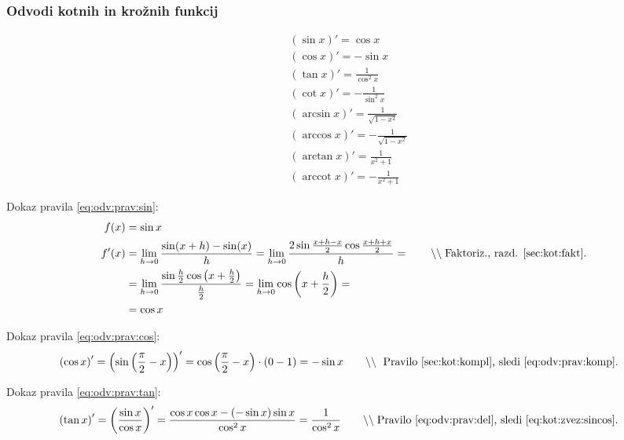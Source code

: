 \documentclass[a4paper,oneside,12pt,fleqn]{article}
\newcommand\krat\cdot
\newcommand{\comment}[1]{\ensuremath{\qquad\backslash\backslash\;}\textnormal{#1}}
\newcommand{\arccot}{\ensuremath{\operatorname{arccot}}} %
\def\kos{\cos}
\def\limh{\lim_{h\rightarrow0}} %
\numberwithin{equation}{section}
\begin{document}
\subsubsection{Odvodi kotnih in krožnih funkcij}
\label{sec:odvod:prav:kot}

\begin{align}
  & \left( \sin x \right)' = \kos x \label{eq:odv:prav:sin} \\
  & \left( \kos x \right)' = -\sin x \label{eq:odv:prav:cos} \\
  & \left( \tan x \right)' = \frac{1}{\kos^2x} \label{eq:odv:prav:tan} \\
  & \left( \cot x \right)' = -\frac{1}{\sin^2x} \label{eq:odv:prav:cot} \\
  & \left( \arcsin x \right)' = \frac{1}{\sqrt{1-x^2}} \label{eq:odv:prav:asin} \\ 
  & \left( \arccos x \right)' = -\frac{1}{\sqrt{1-x^2}} \label{eq:odv:prav:acos} \\ 
  & \left( \arctan x \right)' = \frac{1}{x^2+1} \label{eq:odv:prav:atan} \\ 
  & \left( \arccot x \right)' = -\frac{1}{x^2+1} \label{eq:odv:prav:acot}
\end{align}

Dokaz pravila \eqref{eq:odv:prav:sin}:
\begin{align*}
  f(x) &= \sin x \\
  f'(x) &= \limh\frac{\sin(x+h)-\sin(x)}{h} =
  \limh\frac{2\sin\frac{x+h-x}{2}\cos\frac{x+h+x}{2}}{h} = \comment{Faktoriz., razd. \ref{sec:kot:fakt}.} \\
  &= \limh\frac{\sin\frac{h}{2}\kos\left( x+\frac{h}{2} \right)}{\frac{h}{2}} =
  \limh\kos\left( x+\frac{h}{2} \right) = \\ &= \kos x
\end{align*}

Dokaz pravila \eqref{eq:odv:prav:cos}:
\begin{align*}
  \left( \kos x \right)' &= \left( \sin\left( \frac{\pi}{2} - x \right) \right)' =
  \kos\left( \frac{\pi}{2} - x \right) \krat \left( 0 - 1 \right) = -\sin x
  \comment{ Pravilo \ref{sec:kot:kompl}, sledi \eqref{eq:odv:prav:komp}.}
\end{align*}

Dokaz pravila \eqref{eq:odv:prav:tan}:
\begin{align*}
  \left( \tan x \right)' &= \left( \frac{\sin x}{\kos x} \right)' = \frac{\kos x\kos x -
  \left( -\sin x \right)\sin x}{\kos^2x} = \frac{1}{\kos^2x} \comment{Pravilo
  \ref{eq:odv:prav:del}, sledi \eqref{eq:kot:zvez:sincos}.} 
\end{align*}
\end{document}
